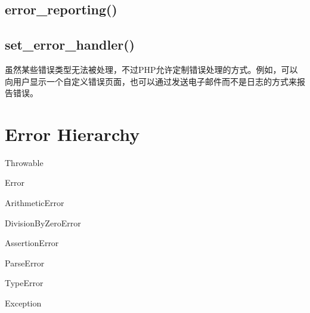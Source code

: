 \begin{lstlisting}[language=PHP]

\end{lstlisting}





\begin{lstlisting}[language=PHP]

\end{lstlisting}




\begin{lstlisting}[language=PHP]

\end{lstlisting}

\subsection{error\_reporting()}


\subsection{set\_error\_handler()}


虽然某些错误类型无法被处理，不过PHP允许定制错误处理的方式。例如，可以向用户显示一个自定义错误页面，也可以通过发送电子邮件而不是日志的方式来报告错误。





\section{Error Hierarchy}




\begin{compactitem}
\item Throwable

\begin{compactitem}
\item Error

\begin{compactitem}
\item ArithmeticError
\begin{compactitem}
\item DivisionByZeroError
\end{compactitem}
\item AssertionError
\item ParseError
\item TypeError
\end{compactitem}

\item Exception

\end{compactitem}
\end{compactitem}





